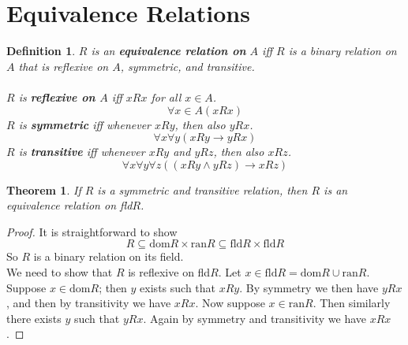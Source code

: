 \documentclass{report}
\newtheorem{theorem}[theo]{Theorem}
\newtheorem{definition}[theo]{Definition}
\begin{document}
\section{Equivalence Relations}
\begin{definition}
$R$ is an \textbf{equivalence relation on} $A$ iff $R$ is a binary relation on $A$ that is reflexive on $A$, symmetric, and transitive.\\
\vspace{1mm}\\
$R$ is \textbf{reflexive on $A$} iff $xRx$ for all $x\in A$.
\begin{equation*}
\forall x\in A(xRx)
\end{equation*}
$R$ is \textbf{symmetric} iff whenever $xRy$, then also $yRx$.
\begin{equation*}
\forall x\forall y(xRy\to yRx)
\end{equation*}
$R$ is \textbf{transitive} iff whenever $xRy$ and $yRz$, then also $xRz$.
\begin{equation*}
\forall x\forall y\forall z((xRy\land yRz)\to xRz)
\end{equation*}
\end{definition}
\begin{theorem}
If $R$ is a symmetric and transitive relation, then $R$ is an equivalence relation on fld$R$.
\end{theorem}
\begin{proof}
It is straightforward to show 
\begin{equation*}
R\subseteq\text{dom}R\times\text{ran}R\subseteq\text{fld}R\times\text{fld}R
\end{equation*}
So $R$ is a binary relation on its field.\\
\indent We need to show that $R$ is reflexive on fld$R$. Let $x\in\text{fld}R=\text{dom}R\cup\text{ran}R$. Suppose $x\in\text{dom}R$; then $y$ exists such that $xRy$. By symmetry we then have $yRx$,
and then by transitivity we have $xRx$. Now suppose $x\in\text{ran}R$. Then similarly there exists $y$ such that $yRx$. Again by symmetry and transitivity we have $xRx$.
\end{proof}
\newpage
\end{document}
